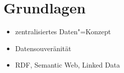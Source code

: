 
\section{Grundlagen}

\begin{itemize}
    \item zentralisiertes Daten"=Konzept
    \item Datensouveränität
    \item RDF, Semantic Web, Linked Data
\end{itemize}
